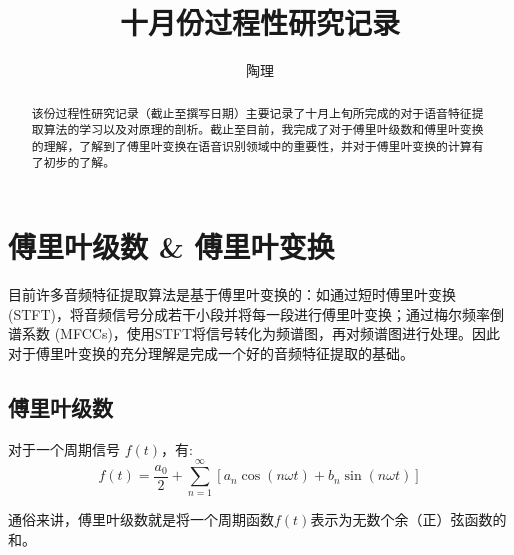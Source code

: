 \documentclass[lang=cn]{elegantpaper}
\title{十月份过程性研究记录}
\author{陶理}
\begin{document}
\def\xmin{-0.7*\T}   %
\def\xmax{6.0}       %
\def\ymin{-1.04}     %
\def\ymax{1.3}       %
\def\A{0.67*\ymax}   %
\def\T{(0.35*\xmax)} %
\def\f#1{\A*4/pi/(#1)*sin(360/\T*#1*Mod(\t,\T))} %
\maketitle

\begin{abstract}
    该份过程性研究记录（截止至撰写日期）主要记录了十月上旬所完成的对于语音特征提取算法的学习以及对原理的剖析。截止至目前，我完成了对于傅里叶级数和傅里叶变换的理解，了解到了傅里叶变换在语音识别领域中的重要性，并对于傅里叶变换的计算有了初步的了解。
\end{abstract}
\section{傅里叶级数 \& 傅里叶变换}

目前许多音频特征提取算法是基于傅里叶变换的：如通过短时傅里叶变换 (STFT)，将音频信号分成若干小段并将每一段进行傅里叶变换；通过梅尔频率倒谱系数 (MFCCs)，使用STFT将信号转化为频谱图，再对频谱图进行处理。因此对于傅里叶变换的充分理解是完成一个好的音频特征提取的基础。

\subsection{傅里叶级数}
对于一个周期信号 $f(t)$，有:
\begin{equation}
    f(t) = \frac{a_0}{2} +\sum_{n=1}^{\infty} [a_n \cos(n\omega t)+b_n\sin(n\omega t)]
\end{equation}

通俗来讲，傅里叶级数就是将一个周期函数$f(t)$表示为无数个余（正）弦函数的和。
\end{document}
